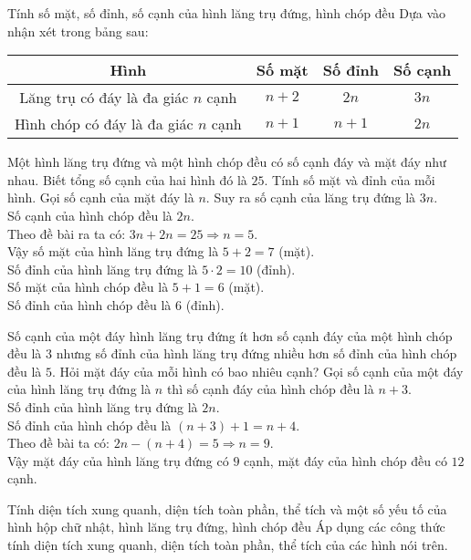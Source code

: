 \begin{dang}{Tính số mặt, số đỉnh, số cạnh của hình lăng trụ đứng, hình chóp đều}
Dựa vào nhận xét trong bảng sau: 
\begin{center}
\begin{tabular}{|c|c|c|c|}
	\hline 
	Hình & Số mặt & Số đỉnh & Số cạnh \\ 
	\hline 
	Lăng trụ có đáy là đa giác $n$ cạnh & $n+2$ & $2n$ & $3n$ \\ 
	\hline 
	Hình chóp có đáy là đa giác $n$ cạnh & $n+1$ & $n+1$ & $2n$ \\ 
	\hline 
\end{tabular} 
\end{center}
\end{dang}
\begin{vd}%
	Một hình lăng trụ đứng và một hình chóp đều có số cạnh đáy và mặt đáy như nhau. Biết tổng số cạnh của hai hình đó là $25$. Tính số mặt và đỉnh của mỗi hình.
	\loigiai
	{
	Gọi số cạnh của mặt đáy là $n$. Suy ra số cạnh của lăng trụ đứng là $3n$.\\
	Số cạnh của hình chóp đều là $2n$.\\
	Theo đề bài ra ta có: $3n+2n=25\Rightarrow n=5$.\\
	Vậy số mặt của hình lăng trụ đứng là $5+2=7$ (mặt).\\
	Số đỉnh của hình lăng trụ đứng là $5\cdot 2=10$ (đỉnh).\\
	Số mặt của hình chóp đều là $5+1=6$ (mặt).\\
	Số đỉnh của hình chóp đều là $6$ (đỉnh).
	}
\end{vd}
\begin{vd}%
Số cạnh của một đáy hình lăng trụ đứng ít hơn số cạnh đáy của một hình chóp đều là $3$ nhưng số đỉnh của hình lăng trụ đứng nhiều hơn số đỉnh của hình chóp đều là $5$. Hỏi mặt đáy của mỗi hình có bao nhiêu cạnh?
	\loigiai
	{
	Gọi số cạnh của một đáy của hình lăng trụ đứng là $n$ thì số cạnh đáy của hình chóp đều là $n+3$.\\
	Số đỉnh của hình lăng trụ đứng là $2n$.\\
	Số đỉnh của hình chóp đều là $(n+3)+1=n+4$.\\
	Theo đề bài ta có: $2n-(n+4)=5\Rightarrow n=9$.\\
	Vậy mặt đáy của hình lăng trụ đứng có $9$ cạnh, mặt đáy của hình chóp đều có $12$ cạnh. 
	}
\end{vd}
\begin{dang}{Tính diện tích xung quanh, diện tích toàn phần, thể tích và một số yếu tố của hình hộp chữ nhật, hình lăng trụ đứng, hình chóp đều}
Áp dụng các công thức tính diện tích xung quanh, diện tích toàn phần, thể tích của các hình nói trên.
\end{dang}
